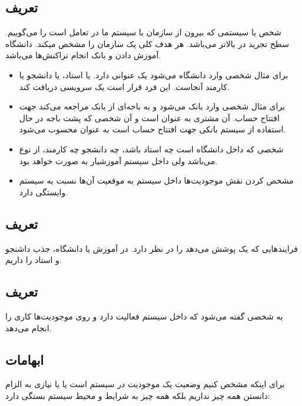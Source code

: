 \subsection{تعریف }

شخص یا سیستمی که بیرون از سازمان با سیستم ما در تعامل است را می‌گوییم. سطح تجرید
در  بالاتر می‌باشد. هر  هدف کلی یک سازمان را مشخص
‌میکند.  دانشگاه آموزش دادن و  بانک انجام تراکنش‌ها می‌باشد.

\begin{itemize}
    \item برای مثال شخصی وارد دانشگاه می‌شود یک عنوانی دارد. یا استاد، یا دانشجو
    یا کارمند آنجاست. این فرد قرار است یک سرویسی دریافت کند.
    \item برای مثال شخصی وارد بانک می‌شود و به باجه‌ای از بانک مراجعه می‌کند جهت
    افتتاح حساب. آن مشتری به عنوان  است و آن شخصی که پشت باجه
    در حال استفاده از سیستم بانکی جهت افتتاح حساب است به عنوان  محسوب
    می‌شود.
    \item شخصی که داخل دانشگاه است چه استاد باشد، چه دانشجو چه کارمند، از نوع
     می‌باشد ولی داخل سیستم آموزشیار به صورت  خواهد
    بود.
    \item مشخص کردن نقش موجودیت‌ها داخل سیستم به موقعیت آن‌ها نسبت به سیستم
    وابستگی دارد.
\end{itemize}

\subsection{تعریف }

فرایند‌هایی که یک  پوشش می‌دهد را در نظر دارد. در 
آموزش یا دانشگاه،  جذب داشنجو و استاد را داریم.

\subsection{تعریف }

به شخصی گفته می‌شود که داخل سیستم فعالیت دارد و روی موجودیت‌ها کاری را انجام
می‌دهد.

\subsection{ابهامات}

برای اینکه مشخص کنیم وضعیت یک موجودیت در سیستم  است یا  یا  نیازی به الزام دانستن همه چیز نداریم بلکه همه چیز
به شرایط و محیط سیستم بستگی دارد:

